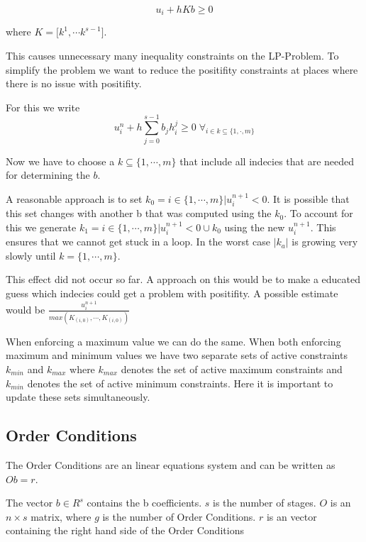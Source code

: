 \documentclass{article}
\begin{document}
\begin{equation}
u_i + h K  b \geq 0     
\end{equation}

where $K = \big[k^1 , \cdots k^{s-1}\big]$.


This causes unnecessary many inequality constraints on the LP-Problem. To simplify the problem we want to reduce the positifity constraints at places where there is no issue with positifity.

For this we write
\begin{equation}
u_i^n + h \sum_{j=0}^{s-1} b_j h_i^j  \geq 0   \;   \forall_{i \in k \subseteq \{1,\cdot,m \}} 
\end{equation}

Now we have to choose a $k \subseteq \{1,\cdots,m \}$ that include all indecies that are needed for determining the $b$.

A reasonable approach is to set $k_0 = {i \in \{1,\cdots,m \} |  u_i^{n+1}  < 0}$. It is possible that this set changes with another b that was computed using the $k_0$. To account for this we generate $k_1 = {i \in \{1,\cdots,m \}|  u_i^{n+1}  < 0} \cup k_0$ using the new $u_i^{n+1}$. This ensures that we cannot get stuck in a loop. In the worst case $|k_a|$ is growing very slowly until $k = \{1,\cdots,m \}$. 

This effect did not occur so far. A approach on this would be to make a educated guess which indecies could get a problem with positifity. A possible estimate would be $\frac{u_i^{n+1}}{max(K_{(i,0)}, \cdots ,K_{(i,0)})} $ 

When enforcing a maximum value we can do the same. When both enforcing maximum and minimum values we have two separate sets of active constraints $k_{min}$ and $k_{max}$ where $k_{max}$ denotes the set of active maximum constraints and $k_{min}$ denotes the set of active minimum constraints. 
Here it is important to update these sets simultaneously.  


\subsection{Order Conditions}

The Order Conditions are an linear equations system and can be written as $O b = r$. 

The vector $b \in R^s$ contains the b coefficients. $s$ is the number of stages. $O$ is an $n \times s$ matrix, where $g$ is the number of Order Conditions. $r$ is an vector containing the right hand side of the Order Conditions
\end{document}
